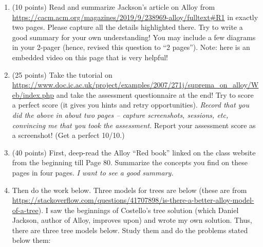 \documentclass[11pt]{article}
\begin{document}
\begin{enumerate}

\item (10 points)
  Read and summarize Jackson's article on Alloy
  from \url{https://cacm.acm.org/magazines/2019/9/238969-alloy/fulltext#R1}
  in exactly two pages. Please capture all the details highlighted there.
  Try to write a good summary for your own understanding! You may include
  a few diagrams in your 2-pager (hence, revised this question to ``2 pages'').
  Note: here is an embedded video on this page that is very helpful!

  
\begin{minipage}{\minpagw}
\end{minipage}  
  

\item (25 points)
  Take the tutorial on
  \url{https://www.doc.ic.ac.uk/project/examples/2007/271j/suprema_on_alloy/Web/index.php}
  and take the assessment questionnaire at the end! Try to score a perfect score (it gives you
  hints and retry opportunities).
  {\em Record that you did the above in about two pages -- capture screenshots, sessions, etc, convincing
    me that you took the assessment.} Report your assessment score as a screenshot! (Get a perfect 10/10.)

\item (40 points)
  First, deep-read the Alloy ``Red book'' linked on the class website
  from the beginning till Page 80.
  Summarize the concepts you find on these pages in four pages.
  {\em I want to see a good summary.}
  \item[] Then do the work below.
    Three models for trees are below (these
  are from
  \url{https://stackoverflow.com/questions/41707898/is-there-a-better-alloy-model-of-a-tree}).
  I saw the beginnings of Costello's tree solution (which Daniel Jackson, author of Alloy, improves upon) and wrote
  my own solution.
  Thus, there are three tree models below.
  Study them and do the problems stated below them:
  \begin{scriptsize}
\begin{verbatim}


\end{verbatim}
\end{scriptsize}
\end{enumerate}
\end{document}
